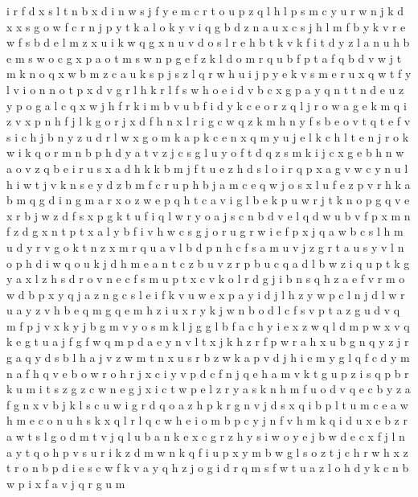 \documentclass{article}
\begin{document}
i r f d x s l t n b
x d i n w s j f y e m c r t o u p z q l
h l p s m c y u r w n j k d x
x s g o w f c r n j p y t k a l
o k y v i q g b d z n a u x c s j h l m f
b y k v r e w f s
b d e l m z x u i k w q g
x n u v d o s l r e h b t k
v k f i t d y z l a n u h b e m s w o c g x p
a o t m s
w n p g e f z k l d o m r q u b
f p t
a f q b d v w j t m k
n o q x w b m z c a
u k s p
j s
z l q r w h u i j p y e k v s m
e r u x q w t f y l v i o n
n o t p x d v g r l h
k
r l f s w h o e i d v b c x g p a y q n t
t n d e u z y p o g a l c q x w j h f r k i m b v
u b f i d y k c e o r z q l j
r o w a g e k m q i z v x p n h f j l
k g
o r j x d f h n
x l r i g c w q z k m h n y f s b e o v t
q t e f v s i c h j b n y z u d r l w x g o m k a p
k c e n
x q m y u j e l k
c h l t e n j r o k
w i k q o r m n b p h d y a t v z j c s g l u
y o f t d q z s m k i j c x g e b h n w a
o v z q b e i r u s x a d h k
k b m j f t u e z h d s l o i r q p x a g v w c y n
u l h i w t j v k n s e y d z b m f c r
u p h b j a m c e q
w j o s x l u f e z p v r h k a b m q g
d i n g m a r x o z w e p q h
t c a v i g l b e k p u w r j
t k n o p g q v e x r b j w z d f s
x p g k t u f i q l w r y o a j s c n b d v
e l q d w u b v f p
x m n f z d
g x n t p
t x a l y b f i v h w c s g j o r
u g r w i e
f p x j q a w b c s l h m u d y r v g o k
t n z x m r q u a v l b
d p n h c f s a m u v j z
g r t a u s y v l n o p h d i w
q o u k j d h m e a n t c z b
u v z r
p b u c q a d
l b w
z i
q u p t k g y a x l z h s d r o v n e c f
s
m u p t x c v k o l r d g j i b n s q h z a e f
v r m o w d b p x y q j a z n g c s l e i f k
v u w e x p a y i d j l h z
y w p c l n
j d l w r u a y z v h b e q m
g q e m h z i u x r y k j w n b o d l c f s v p t a
z g u d v q m
f p j
v x k y j b g m
v y o s m k l j g
g l
b f a c h y i e x z w q l d m p
w x v q k e g t u a j f
g f w q m p d a e y n v l t x j k h z r
f
p w r a h x u b g n q y z j
r g a q
y d s b l h a j v z w m
t n x u s r b z w k a p v d j h i e m y g l q f c
d y m n a f h q v e b o w r
o h r j x c i y v p d
c f n j q e h a m v k t g u p z i s
q p b r k u m i t s z g
z c w n e
g j x i c t w p e l z r y a s k n h m f u o d v q
e c b y z a f g
n x v b j k l s c u w i g r d q o a z h p
k r g n v j d s x q i b p l t u m c e a w h
m e c o n u h s k x q
l r
l q c w h e i o m b
p c y j n f v h m k q i d u x e b z r a w t s l g o
d m t v j q l u b a n k e x c g r z h y s i w o
y e j b w d
e c x f j l n a y t q o h p v s u r i k z d m w
n k q f i u p x y m b w g l s o z t j c h r
w h x z
t r o n b p d i e s c w f k v a y q h z j
o g i d r q m s f w t u a
z l o h d y k c n b w p i x f a v j q r g u m
\end{document}
